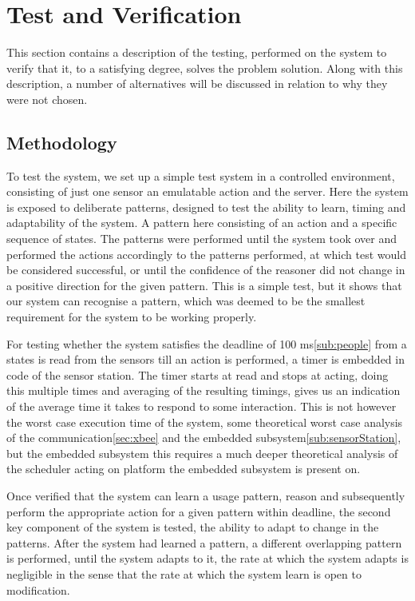\chapter{Test and Verification}
This section contains a description of the testing, performed on the system to verify that it, to a satisfying degree, solves the problem solution. Along with this description, a number of alternatives will be discussed in relation to why they were not chosen.

\section{Methodology}
To test the system, we set up a simple test system in a controlled environment, consisting of just one sensor an emulatable action and the server. Here the system is exposed to deliberate patterns, designed to test the ability to learn, timing and adaptability of the system. A pattern here consisting of an action and a specific sequence of states. The patterns were performed until the system took over and performed the actions accordingly to the patterns performed, at which test would be considered successful, or until the confidence of the reasoner did not change in a positive direction for the given pattern. This is a simple test, but it shows that our system can recognise a pattern, which was deemed to be the smallest requirement for the system to be working properly.

For testing whether the system satisfies the deadline of 100 ms\cref{sub:people} from a states is read from the sensors till an action is performed, a timer is embedded in code of the sensor station. The timer starts at read and stops at acting, doing this multiple times and averaging of the resulting timings, gives us an indication of the average time it takes to respond to some interaction. This is not however the worst case execution time of the system, some theoretical worst case analysis of the communication\cref{sec:xbee} and the embedded subsystem\cref{sub:sensorStation}, but the embedded subsystem this requires a much deeper theoretical analysis of the scheduler acting on platform the embedded subsystem is present on.

Once verified that the system can learn a usage pattern, reason and subsequently perform the appropriate action for a given pattern within deadline, the second key component of the system is tested, the ability to adapt to change in the patterns. After the system had learned a pattern, a different overlapping pattern is performed, until the system adapts to it, the rate at which the system adapts is negligible in the sense that the rate at which the system learn is open to modification.
